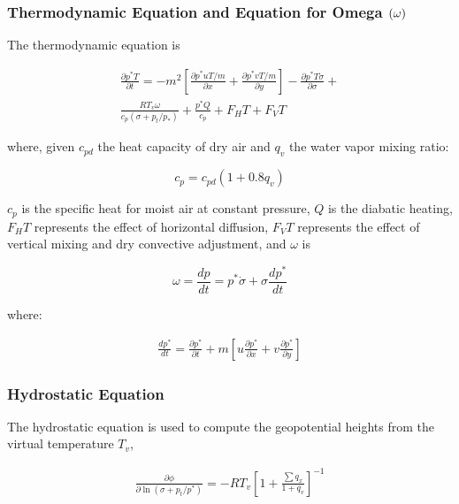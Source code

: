 \subsubsection{Thermodynamic Equation and Equation for Omega ${\bf (\omega)}$}

The thermodynamic equation is

\begin{eqnarray}
\frac{\partial{p^{\ast}T}}{\partial{t}} = 
-m^2 \left[ \frac{\partial{p^{\ast}uT/m}}{\partial{x}} +
      \frac{\partial{p^{\ast}vT/m}}{\partial{y}} \right] -
      \frac{\partial{p^{\ast}T\dot{\sigma}}}{\partial{\sigma}} +
      \nonumber \\
  \frac{RT_v\omega}{c_{p}(\sigma + p_t/p_{\ast})} +
  \frac{p^{\ast}Q}{c_{p}} + F_HT + F_VT
\end{eqnarray}

where, given $c_{pd}$ the heat capacity of dry air and
$q_v$ the water vapor mixing ratio:

\begin{equation}
c_{p} = c_{pd} \left( 1 + 0.8q_v \right)
\end{equation}

$c_p$ is the specific heat for moist air at constant pressure, $Q$ is the
diabatic heating, $F_HT$ represents the effect of horizontal diffusion,
$F_VT$ represents the effect of vertical mixing and dry convective adjustment,
and $\omega$ is

\begin{equation}
  \omega = \frac{dp}{dt} = p^{\ast} \dot{\sigma} +
            \sigma \frac{dp^{\ast}}{dt}
\end{equation}

where:
  
\begin{eqnarray}
\frac{dp^{\ast}}{dt} =
   \frac{\partial{p^{\ast}}}{\partial{t}} + m
   \left[ u \frac{\partial{p^{\ast}}}{\partial{x}} +
          v \frac{\partial{p^{\ast}}}{\partial{y}} \right]
\end{eqnarray}

\subsubsection{Hydrostatic Equation}

The hydrostatic equation is used to compute the geopotential heights from
the virtual temperature $T_v$,

\begin{eqnarray}
\label{hydrostatic_equation}
\frac{\partial{\phi}}{\partial{\ln(\sigma + p_t / p^{\ast})}} =
-RT_v \left[ 1 + \frac{\sum{q_x}}{1 + q_v} \right]^{-1}
\end{eqnarray}

